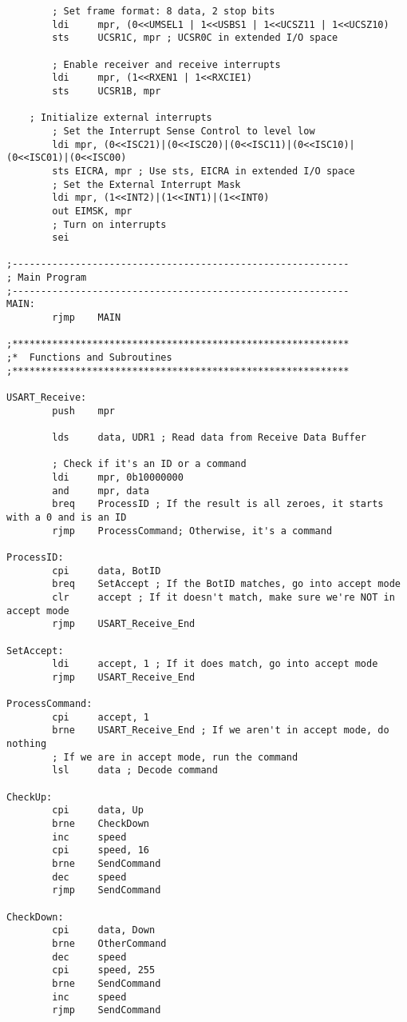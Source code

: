 \documentclass[12pt,letterpaper]{article}
\begin{document}
\begin{verbatim}
        ; Set frame format: 8 data, 2 stop bits
        ldi     mpr, (0<<UMSEL1 | 1<<USBS1 | 1<<UCSZ11 | 1<<UCSZ10)
        sts     UCSR1C, mpr ; UCSR0C in extended I/O space

        ; Enable receiver and receive interrupts
        ldi     mpr, (1<<RXEN1 | 1<<RXCIE1)
        sts     UCSR1B, mpr

    ; Initialize external interrupts
        ; Set the Interrupt Sense Control to level low
        ldi mpr, (0<<ISC21)|(0<<ISC20)|(0<<ISC11)|(0<<ISC10)|(0<<ISC01)|(0<<ISC00)
        sts EICRA, mpr ; Use sts, EICRA in extended I/O space
        ; Set the External Interrupt Mask
        ldi mpr, (1<<INT2)|(1<<INT1)|(1<<INT0)
        out EIMSK, mpr
        ; Turn on interrupts
        sei

;-----------------------------------------------------------
; Main Program
;-----------------------------------------------------------
MAIN:
        rjmp    MAIN

;***********************************************************
;*  Functions and Subroutines
;***********************************************************

USART_Receive:
        push    mpr

        lds     data, UDR1 ; Read data from Receive Data Buffer

        ; Check if it's an ID or a command
        ldi     mpr, 0b10000000
        and     mpr, data
        breq    ProcessID ; If the result is all zeroes, it starts with a 0 and is an ID
        rjmp    ProcessCommand; Otherwise, it's a command

ProcessID:
        cpi     data, BotID
        breq    SetAccept ; If the BotID matches, go into accept mode
        clr     accept ; If it doesn't match, make sure we're NOT in accept mode
        rjmp    USART_Receive_End

SetAccept:
        ldi     accept, 1 ; If it does match, go into accept mode
        rjmp    USART_Receive_End

ProcessCommand:
        cpi     accept, 1
        brne    USART_Receive_End ; If we aren't in accept mode, do nothing
        ; If we are in accept mode, run the command
        lsl     data ; Decode command

CheckUp:
        cpi     data, Up
        brne    CheckDown
        inc     speed
        cpi     speed, 16
        brne    SendCommand
        dec     speed
        rjmp    SendCommand

CheckDown:
        cpi     data, Down
        brne    OtherCommand
        dec     speed
        cpi     speed, 255
        brne    SendCommand
        inc     speed
        rjmp    SendCommand


\end{verbatim}
\end{document}
